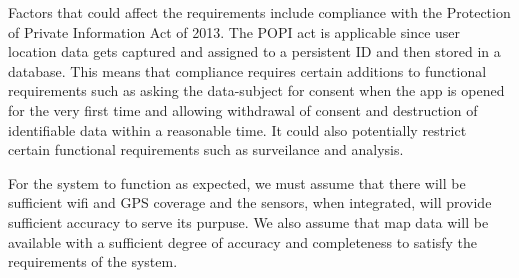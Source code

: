 Factors that could affect the requirements include compliance with the Protection of Private Information Act of 2013. The POPI act is applicable since user location data gets captured and assigned to a persistent ID and then stored in a database. This means that compliance requires certain additions to functional requirements such as asking the data-subject for consent when the app is opened for the very first time and allowing withdrawal of consent and destruction of identifiable data within a reasonable time. It could also potentially restrict certain functional requirements such as surveilance and analysis.

For the system to function as expected, we must assume that there will be sufficient wifi and GPS coverage and the sensors, when integrated, will provide sufficient accuracy to serve its purpuse. We also assume that map data will be available with a sufficient degree of accuracy and completeness to satisfy the requirements of the system.
